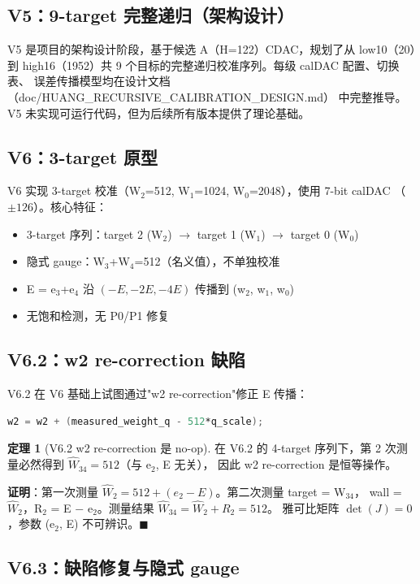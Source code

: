 \documentclass[UTF8,a4paper,12pt]{ctexart}
\theoremstyle{definition}
\newtheorem{theorem}{定理}[section]
\begin{document}
\subsection{V5：9-target 完整递归（架构设计）}

V5 是项目的架构设计阶段，基于候选 A（H=122）CDAC，规划了从 low10（20）到
high16（1952）共 9 个目标的完整递归校准序列。每级 calDAC 配置、切换表、
误差传播模型均在设计文档（doc/HUANG\_RECURSIVE\_CALIBRATION\_DESIGN.md）
中完整推导。V5 未实现可运行代码，但为后续所有版本提供了理论基础。

\subsection{V6：3-target 原型}

V6 实现 3-target 校准（W$_2$=512, W$_1$=1024, W$_0$=2048），使用 7-bit calDAC
（$\pm 126$）。核心特征：
\begin{itemize}
  \item 3-target 序列：target 2 (W$_2$) $\to$ target 1 (W$_1$) $\to$ target 0 (W$_0$)
  \item 隐式 gauge：W$_3$+W$_4$=512（名义值），不单独校准
  \item E = e$_3$+e$_4$ 沿 $(-E, -2E, -4E)$ 传播到 (w$_2$, w$_1$, w$_0$)
  \item 无饱和检测，无 P0/P1 修复
\end{itemize}

\subsection{V6.2：w2 re-correction 缺陷}

V6.2 在 V6 基础上试图通过"w2 re-correction"修正 E 传播：
\begin{lstlisting}[language=verilog]
w2 = w2 + (measured_weight_q - 512*q_scale);
\end{lstlisting}

\begin{theorem}[V6.2 w2 re-correction 是 no-op]
在 V6.2 的 4-target 序列下，第 2 次测量必然得到 $\hat W_{34} = 512$（与 e$_2$, E 无关），
因此 w2 re-correction 是恒等操作。
\end{theorem}

\textbf{证明}：第一次测量 $\hat W_2 = 512 + (e_2 - E)$。第二次测量 target = W$_{34}$，
wall = $\hat W_2$，R$_2$ = E $-$ e$_2$。测量结果 $\hat W_{34} = \hat W_2 + R_2 = 512$。
雅可比矩阵 $\det(J) = 0$，参数 (e$_2$, E) 不可辨识。$\blacksquare$

\subsection{V6.3：缺陷修复与隐式 gauge}
\end{document}
